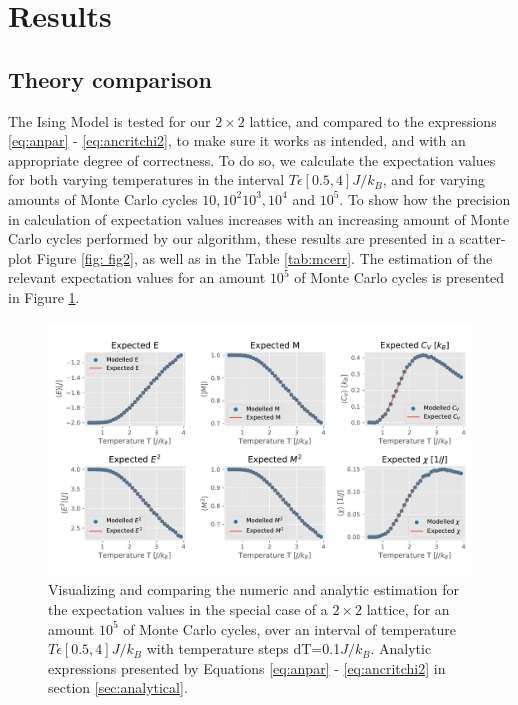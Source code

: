 \documentclass[10pt, nofootinbib, twocolumn]{revtex4-1}
\begin{document}
\cleardoublepage 
\section{Results}\label{sec:results}
\subsection{Theory comparison}
The Ising Model is tested for our $2\times 2$ lattice, and compared to the expressions \eqref{eq:anpar} - \eqref{eq:ancritchi2}, to make sure it works as intended, and with an appropriate degree of correctness. To do so, we calculate the expectation values for both varying temperatures in the interval $T\epsilon [0.5,4]J/k_B$, and for varying amounts of Monte Carlo cycles $10, 10^2 10^3, 10^4$ and $10^5$. 
To show how the precision in calculation of expectation values increases with an increasing amount of Monte Carlo cycles performed by our algorithm, these results are presented in a scatter-plot Figure \ref{fig: fig2}, as well as in the Table \ref{tab:mcerr}. The estimation of the relevant expectation values for an amount $10^5$ of Monte Carlo cycles is presented in Figure \ref{fig: fig1}. \\

\begin{figure}[H]
    \centering
    \includegraphics[width = 1\textwidth]{figures/expected_values.pdf} 
    \caption{Visualizing and comparing the numeric and analytic estimation for the expectation values in the special case of a $2\times 2$  lattice, for an amount $10^5$ of Monte Carlo cycles, over an interval of temperature $T\epsilon [0.5,4]J/k_B$ with temperature steps dT=0.1$J/k_B$. Analytic expressions presented by Equations \ref{eq:anpar} - \ref{eq:ancritchi2} in section \ref{sec:analytical}.}
    \label{fig: fig1}
\end{figure} 
\end{document}

